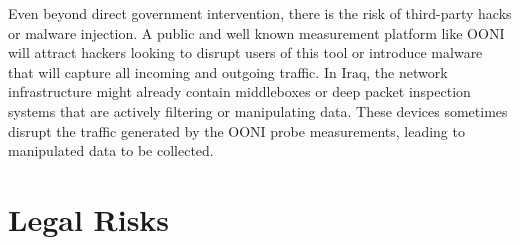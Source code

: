Even beyond direct government intervention, there is the risk of third-party hacks or malware injection. A public and well known measurement platform like OONI will attract hackers looking to disrupt users of this tool or introduce malware that will capture all incoming and outgoing traffic. In Iraq, the network infrastructure might already contain middleboxes or deep packet inspection systems that are actively filtering or manipulating data. These devices sometimes disrupt the traffic generated by the OONI probe measurements, leading to manipulated data to be collected.

\section{Legal Risks}



